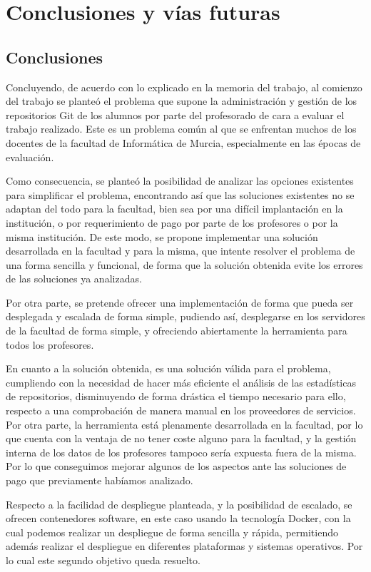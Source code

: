 \chapter{Conclusiones y vías futuras\label{05conclusiones}}

\section{Conclusiones}

Concluyendo, de acuerdo con lo explicado en la memoria del trabajo, al
comienzo del trabajo se planteó el problema que supone la administración y
gestión de los repositorios Git de los alumnos por parte del profesorado de
cara a evaluar el trabajo realizado. Este es un problema común al que se
enfrentan muchos de los docentes de la facultad de Informática de Murcia,
especialmente en las épocas de evaluación.

Como consecuencia, se planteó la posibilidad de analizar las opciones
existentes para simplificar el problema, encontrando así que las soluciones
existentes no se adaptan del todo para la facultad, bien sea por una
difícil implantación en la institución, o por requerimiento de pago por
parte de los profesores o por la misma institución. De este modo, se
propone implementar una solución desarrollada en la facultad y para la
misma, que intente resolver el problema de una forma sencilla y funcional,
de forma que la solución obtenida evite los errores de las soluciones ya
analizadas.

Por otra parte, se pretende ofrecer una implementación de forma que pueda
ser desplegada y escalada de forma simple, pudiendo así, desplegarse en los
servidores de la facultad de forma simple, y ofreciendo abiertamente la
herramienta para todos los profesores.

En cuanto a la solución obtenida, es una solución válida para el problema,
cumpliendo con la necesidad de hacer más eficiente el análisis de las
estadísticas de repositorios, disminuyendo de forma drástica el tiempo
necesario para ello, respecto a una comprobación de manera manual en los
proveedores de servicios. Por otra parte, la herramienta está plenamente
desarrollada en la facultad, por lo que cuenta con la ventaja de no tener
coste alguno para la facultad, y la gestión interna de los datos de los
profesores tampoco sería expuesta fuera de la misma. Por lo que conseguimos
mejorar algunos de los aspectos ante las soluciones de pago que previamente
habíamos analizado.

Respecto a la facilidad de despliegue planteada, y la posibilidad de
escalado, se ofrecen contenedores software, en este caso usando la
tecnología Docker, con la cual podemos realizar un despliegue de forma
sencilla y rápida, permitiendo además realizar el despliegue en diferentes
plataformas y sistemas operativos. Por lo cual este segundo objetivo queda
resuelto.

